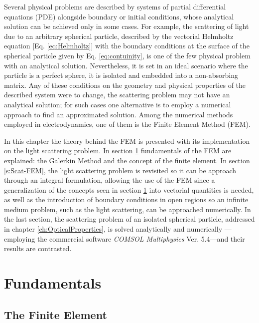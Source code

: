 \documentclass[11pt]{Latex/Classes/PhDthesisPSnPDF}
\begin{document}
    Several physical problems are described by systems of partial differential equations (PDE) alongside boundary or initial conditions, whose analytical solution can be achieved only in some cases. For example, the scattering of light due to an arbitrary spherical particle, described by the vectorial Helmholtz equation [Eq. \eqref{eq:Helmholtz}] with the boundary conditions at the surface of the spherical particle given by Eq. \eqref{eq:contuinity},   is one of the few physical problem with an analytical solution. Nevertheless, it is set in an ideal scenario where the particle is a perfect sphere, it is isolated and embedded into a non-absorbing matrix. Any of  these conditions on the geometry and physical properties of the described system were to change, the scattering problem may not have an analytical solution;  for such cases one alternative is to employ a numerical approach to find an approximated solution.  Among the numerical methods employed in electrodynamics, one of them is the Finite Element Method (FEM).

    In this chapter the theory behind the FEM is presented with its implementation on the light scattering problem. In section \ref{s:FEM-Fund} fundamentals of the FEM are explained: the Galerkin Method and the concept of the finite element. In section \ref{s:Scat-FEM}, the light scattering problem is revisited so it can be approach through an integral formulation, allowing the use of the FEM since a generalization of the concepts seen in section \ref{s:FEM-Fund}  into vectorial quantities is needed, as well as the introduction of boundary conditions in open regions so an infinite medium problem, such as the light scattering, can be approached numerically. In the last section, the scattering problem of an isolated spherical particle, addressed in chapter \ref{ch:OpticalProperties}, is solved analytically and numerically ---employing the commercial software \textit{COMSOL Multiphysics} Ver. 5.4---and their results are contrasted.

    \section{Fundamentals}
     \label{s:FEM-Fund}
     

        \subsection{The Finite Element}
         \label{ss:FEM-FE}
         
\end{document}
